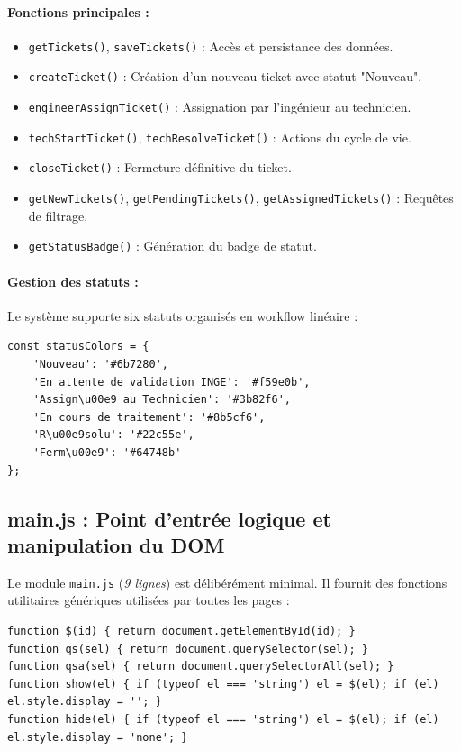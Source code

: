 \documentclass[12pt,a4paper,twoside]{report}
\begin{document}
\paragraph{Fonctions principales :}
\begin{itemize}
    \item \texttt{getTickets()}, \texttt{saveTickets()} : Accès et persistance des données.
    \item \texttt{createTicket()} : Création d'un nouveau ticket avec statut "Nouveau".
    \item \texttt{engineerAssignTicket()} : Assignation par l'ingénieur au technicien.
    \item \texttt{techStartTicket()}, \texttt{techResolveTicket()} : Actions du cycle de vie.
    \item \texttt{closeTicket()} : Fermeture définitive du ticket.
    \item \texttt{getNewTickets()}, \texttt{getPendingTickets()}, \texttt{getAssignedTickets()} : Requêtes de filtrage.
    \item \texttt{getStatusBadge()} : Génération du badge de statut.
\end{itemize}

\paragraph{Gestion des statuts :}
Le système supporte six statuts organisés en workflow linéaire :

\begin{lstlisting}[style=jsstyle]
const statusColors = {
    'Nouveau': '#6b7280',
    'En attente de validation INGE': '#f59e0b',
    'Assign\u00e9 au Technicien': '#3b82f6',
    'En cours de traitement': '#8b5cf6',
    'R\u00e9solu': '#22c55e',
    'Ferm\u00e9': '#64748b'
};
\end{lstlisting}

\subsection{main.js : Point d'entrée logique et manipulation du DOM}

Le module \texttt{main.js} (\textit{9 lignes}) est délibérément minimal. Il fournit des fonctions utilitaires génériques utilisées par toutes les pages :

\begin{lstlisting}[style=jsstyle]
function $(id) { return document.getElementById(id); }
function qs(sel) { return document.querySelector(sel); }
function qsa(sel) { return document.querySelectorAll(sel); }
function show(el) { if (typeof el === 'string') el = $(el); if (el) el.style.display = ''; }
function hide(el) { if (typeof el === 'string') el = $(el); if (el) el.style.display = 'none'; }
\end{lstlisting}
\end{document}
